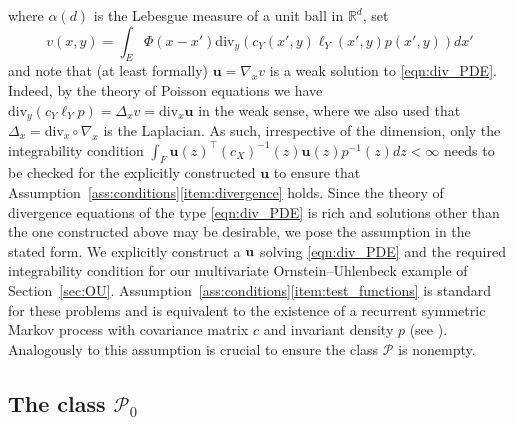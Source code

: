 \documentclass{article}
\theoremstyle{plain}
\theoremstyle{definition}
\newcommand{\R}{\mathbb{R}}
\newcommand{\Pcal}{{\mathcal P}}
\numberwithin{lem}{section}
\begin{document}
where $\alpha(d)$ is the Lebesgue measure of a unit ball in $\R^d$, set \[v(x,y) = \int_E \Phi(x-x')\mathrm{div}_y(c_Y(x',y)\ell_Y(x',y)p(x',y))dx'\] and note that (at least formally) $\mathbf{u} = \nabla_x v$ is a weak solution to \eqref{eqn:div_PDE}. Indeed, by the theory of Poisson equations we have $\mathrm{div}_y(c_Y\ell_Yp) = \Delta_x v = \mathrm{div}_x \mathbf{u}$ in the weak sense, where we also used that $\Delta_x = \mathrm{div}_x \circ \nabla_x$ is the Laplacian. As such, irrespective of the dimension, only the integrability condition $\int_F \mathbf{u}(z)^\top (c_X)^{-1}(z)\mathbf{u}(z)p^{-1}(z)dz < \infty$ needs to be checked for the explicitly constructed $\mathbf{u}$ to ensure that Assumption~\ref{ass:conditions}\ref{item:divergence} holds.  Since the theory of divergence equations of the type \eqref{eqn:div_PDE} is rich and solutions other than the one constructed above may be desirable, we pose the assumption in the stated form. We explicitly construct a ${\bf u}$ solving \eqref{eqn:div_PDE} and the required integrability condition for our multivariate Ornstein--Uhlenbeck example of Section~\ref{sec:OU}. Assumption~\ref{ass:conditions}\ref{item:test_functions} is standard for these problems and is equivalent to the existence of a recurrent symmetric Markov process with covariance matrix $c$ and invariant density $p$ (see \cite[Theorem~1.6.3]{fukushimadirichlet994}). Analogously to \cite{kardaras2021ergodic,itkin2025ergodic} this assumption is crucial to ensure the class $\Pcal$ is nonempty.
\subsection{The class \texorpdfstring{$\Pcal_0$}{P₀}}
\end{document}
